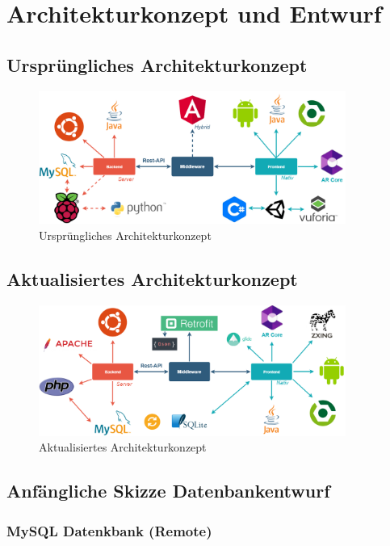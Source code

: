 \documentclass{scrartcl}
\begin{document}
\newpage

\section{Architekturkonzept und Entwurf}

\subsection{Ursprüngliches Architekturkonzept}

\begin{figure}[h]
\centering
\includegraphics[width=380px]{img/Architekturkonzept.png}
\caption{Ursprüngliches Architekturkonzept}
\end{figure}

\subsection{Aktualisiertes Architekturkonzept}

\begin{figure}[h]
\centering
\includegraphics[width=380px]{img/ArchitekturkonzeptNew.png}
\caption{Aktualisiertes Architekturkonzept}
\end{figure}

\newpage

\subsection{Anfängliche Skizze Datenbankentwurf}

\subsubsection{MySQL Datenkbank (Remote)}
\end{document}
